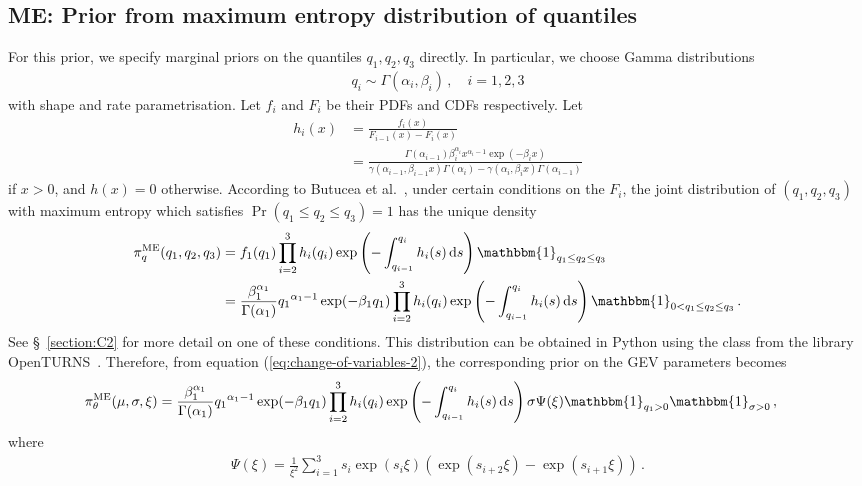 \documentclass{article}
\newcommand{\dd}{{\rm d}}
\begin{document}
\subsection{ME:
	Prior from maximum entropy distribution of quantiles}
\label{section:prior-me}
%

%
For this prior, we specify marginal priors on the quantiles
$q_1, q_2, q_3$ directly.
In particular, we choose Gamma distributions
%
\begin{align*}
	q_i \sim \Gamma(\alpha_i, \beta_i) \,, \quad i = 1, 2, 3
\end{align*}
%
with shape and rate parametrisation.
Let $f_i$ and $F_i$ be their PDFs and CDFs respectively. Let
%
\begin{align*}
	h_i(x) &= \frac{f_i(x)}{F_{i - 1}(x) - F_i(x)}\\
	&= \frac{\Gamma(\alpha_{i - 1})\beta_i ^ {\alpha_i} x ^ {\alpha_i - 1}
		\exp(-\beta_i x)}{\gamma(\alpha_{i - 1}, \beta_{i - 1} x)
		\Gamma(\alpha_{i}) - \gamma(\alpha_i, \beta_i x)\Gamma(\alpha_{i - 1})}
\end{align*}
%
if $x > 0$, and $h(x) = 0$ otherwise.
According to Butucea et al.~\cite{butucea2018},
under certain conditions on the $F_i$,
the joint distribution of $(q_1, q_2, q_3)$ with maximum entropy
which satisfies $\Pr(q_1 \leq q_2 \leq q_3) = 1$ has the unique density
%
\begin{align*}
	\pi^{\text{ME}}_q(q_1, q_2, q_3) &= f_1(q_1) \prod_{i=2}^3 h_i(q_i)
		\exp\left(-\int_{q_{i - 1}}^{q_i} h_i(s) \, \dd s\right)
		\mathbbm{1}_{q_1 \leq q_2 \leq q_3}\\
	&=\frac{\beta_1 ^ {\alpha_1}}{\Gamma(\alpha_1)} {q_1} ^ {\alpha_1 - 1}
		\exp(-\beta_1 q_1)\prod_{i=2}^3 h_i(q_i)
		\exp\left(-\int_{q_{i - 1}}^{q_i} h_i(s) \, \dd s\right)
		\mathbbm{1}_{0 < q_1 \leq q_2 \leq q_3} \,.
\end{align*}
%
See \S~\ref{section:C2} for more detail on one of these conditions.
This distribution can be obtained in Python using the class
from the library OpenTURNS~\cite{OpenTURNS}.
Therefore, from equation (\ref{eq:change-of-variables-2}),
the corresponding prior on the GEV parameters becomes
%
\begin{align}
	\pi^{\text{ME}}_\theta(\mu, \sigma, \xi)
		&=\frac{\beta_1 ^ {\alpha_1}}{\Gamma(\alpha_1)} {q_1}^{\alpha_1 - 1}
		\exp(-\beta_1 q_1) \prod_{i=2}^3 h_i(q_i)
		\exp\left(-\int_{q_{i - 1}}^{q_i} h_i(s) \, \dd s\right)
		\sigma \Psi(\xi) \mathbbm{1}_{q_1 > 0} \mathbbm{1}_{\sigma > 0} \,,
\end{align}
%
where
%
\begin{align*}
	\Psi(\xi) = \frac{1}{\xi ^ {2}} \sum_{i = 1}^3 s_i \exp(s_i \xi)
		(\exp(s_{i + 2}\xi) - \exp(s_{i + 1} \xi)) \,.
\end{align*}
%
\end{document}
